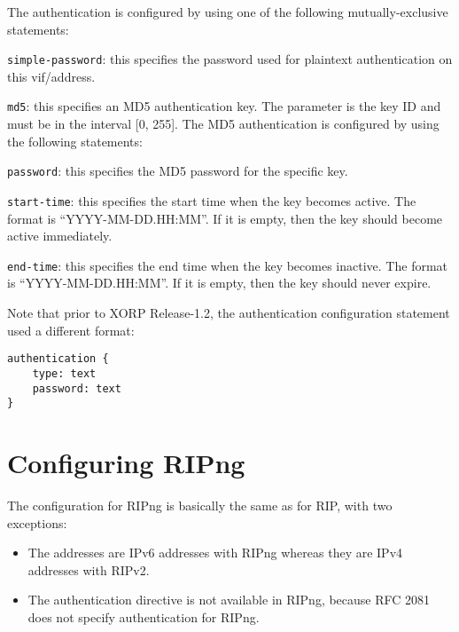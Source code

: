 \begin{description}
\begin{description}
The authentication is configured by using one of the following
mutually-exclusive statements:

\begin{description}
\item{\tt simple-password}: this specifies the password used for
  plaintext authentication on this vif/address.
\item{\tt md5}: this specifies an MD5 authentication key. The parameter
  is the key ID and must be in the interval [0, 255].
  The MD5 authentication is configured by using the following
  statements:
\begin{description}
  \item{\tt password}: this specifies the MD5 password for the specific
  key.
  \item{\tt start-time}: this specifies the start time when the key
  becomes active. The format is ``YYYY-MM-DD.HH:MM''. If it is empty,
  then the key should become active immediately.
  \item{\tt end-time}: this specifies the end time when the key becomes
  inactive. The format is ``YYYY-MM-DD.HH:MM''. If it is empty,
  then the key should never expire.
\end{description}
\end{description}

Note that prior to XORP Release-1.2, the authentication configuration
statement used a different format:
\begin{verbatim}
authentication {
    type: text
    password: text
}
\end{verbatim}

\end{description}
\end{description}

\section{Configuring RIPng}

The configuration for RIPng is basically the same as for RIP, with two
exceptions:
\begin{itemize}
\item The addresses are IPv6 addresses with RIPng whereas they are IPv4
  addresses with RIPv2.
\item The {\stt authentication} directive is not available in RIPng,
  because RFC 2081 does not specify authentication for RIPng.
\end{itemize}

